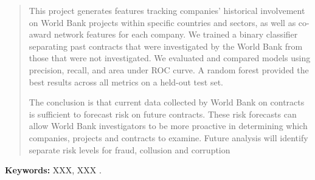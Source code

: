 \begin{quotation}
This project generates features tracking companies' historical involvement on World Bank projects within specific countries and sectors, as well as co-award network features for each company. We trained a binary classifier separating past contracts that were investigated by the World Bank from those that were not investigated. We evaluated and compared models using precision, recall, and area under ROC curve. A random forest provided the best results across all metrics on a held-out test set.

The conclusion is that current data collected by World Bank on contracts is sufficient to forecast risk on future contracts. These risk forecasts can allow World Bank investigators to be more proactive in determining which companies, projects and contracts to examine. Future analysis will identify separate risk levels for fraud, collusion and corruption
\end{quotation}

\vfill
\small \noindent \textbf{Keywords:} XXX, XXX .
\normalsize